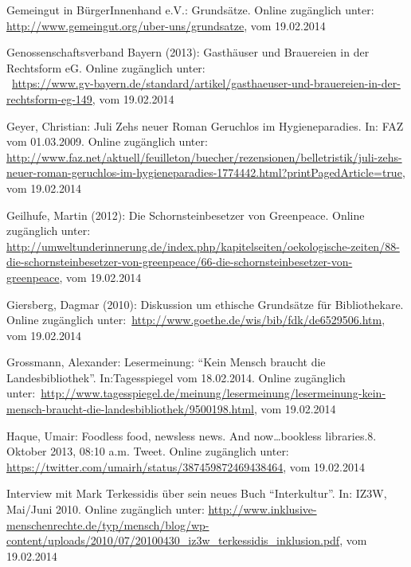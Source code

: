 \documentclass[a4paper,
fontsize=11pt,
oneside,
numbers=noperiodatend,
parskip=half-,
bibliography=totoc,
final
]{scrartcl}
\begin{document}
\newpage

Gemeingut in BürgerInnenhand e.V.: Grundsätze. Online zugänglich
unter: \\
\href{http://www.gemeingut.org/uber-uns/grundsatze}{http://www.gemeingut.org/uber-uns/grundsatze}, vom
19.02.2014

Genossenschaftsverband Bayern (2013): Gasthäuser und Brauereien in der
Rechtsform eG. Online zugänglich
unter: \\
~\href{https://www.gv-bayern.de/standard/artikel/gasthaeuser-und-brauereien-in-der-rechtsform-eg-149}{https://www.gv-bayern.de/standard/artikel/gasthaeuser-und-brauereien-in-der-rechtsform-eg-149},
vom 19.02.2014

Geyer, Christian: Juli Zehs neuer Roman Geruchlos im Hygieneparadies.
In: FAZ vom 01.03.2009. Online zugänglich unter:~
\url{http://www.faz.net/aktuell/feuilleton/buecher/rezensionen/belletristik/juli-zehs-neuer-roman-geruchlos-im-hygieneparadies-1774442.html?printPagedArticle=true},
vom 19.02.2014

Geilhufe, Martin (2012): Die Schornsteinbesetzer von Greenpeace. Online
zugänglich unter:~ \\
\href{http://umweltunderinnerung.de/index.php/kapitelseiten/oekologische-zeiten/88-die-schornsteinbesetzer-von-greenpeace/66-die-schornsteinbesetzer-von-greenpeace}{http://umweltunderinnerung.de/index.php/kapitelseiten/oekologische-zeiten/88-die-schornstein\-besetzer-von-greenpeace/66-die-schorn\-steinbesetzer-von-greenpeace},
vom 19.02.2014~

Giersberg, Dagmar (2010): Diskussion um ethische Grundsätze für
Bibliothekare. Online zugänglich
unter:~\url{http://www.goethe.de/wis/bib/fdk/de6529506.htm}, vom
19.02.2014

Grossmann, Alexander: Lesermeinung: \enquote{Kein Mensch braucht die
Landesbibliothek}. In:Tagesspiegel vom 18.02.2014. Online zugänglich
unter:~\url{http://www.tagesspiegel.de/meinung/lesermeinung/lesermeinung-kein-mensch-braucht-die-landesbibliothek/9500198.html},
vom 19.02.2014

Haque, Umair: Foodless food, newsless news. And now\ldots{}bookless
libraries.8. Oktober 2013, 08:10 a.m. Tweet. Online zugänglich unter:~
\url{https://twitter.com/umairh/status/387459872469438464}, vom
19.02.2014

Interview mit Mark Terkessidis über sein neues Buch
\enquote{Interkultur}. In: IZ3W, Mai/Juni 2010. Online zugänglich unter:
\url{http://www.inklusive-menschenrechte.de/typ/mensch/blog/wp-content/uploads/2010/07/20100430_iz3w_terkessidis_inklusion.pdf},
vom 19.02.2014
\end{document}
